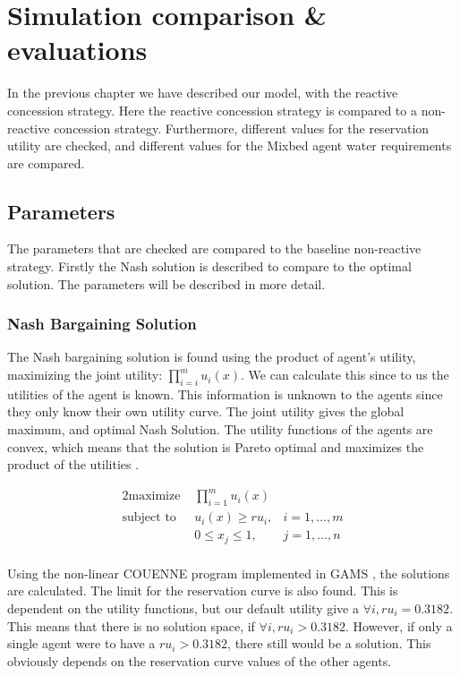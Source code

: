 \chapter{Simulation comparison \& evaluations}
\label{ch:eval}
In the previous chapter we have described our model, with the reactive concession strategy. Here the reactive concession strategy is compared to a non-reactive concession strategy. Furthermore, different values for the reservation utility are checked, and different values for the Mixbed agent water requirements are compared. 

\section{Parameters}
The parameters that are checked are compared to the baseline non-reactive strategy. Firstly the Nash solution is described to compare to the optimal solution. The parameters will be described in more detail.

\subsection{Nash Bargaining Solution}
The Nash bargaining solution is found using the product of agent's utility, maximizing the joint utility: $\prod_{i=i}^{m}u_i(x).$ We can calculate this since to us the utilities of the agent is known. This information is unknown to the agents since they only know their own utility curve. The joint utility gives the global maximum, and optimal Nash Solution. The utility functions of the agents are convex, which means that the solution is Pareto optimal and maximizes the product of the utilities \citep{nash1950bargaining, roth1977individual, lensberg1988stability}. 

\begin{alignat*}{2}
\text{maximize }   	& \prod_{i=1}^m u_i(x)  \\
\text{subject to \ } 	& u_i(x) \geq ru_i, & i = 1,...,m\\
& 0\leq x_j\leq 1, & j = 1,...,n\\
\end{alignat*}

Using the non-linear COUENNE program \citep{belotti2013mixed} implemented in GAMS \citep{GamsSoftware2013}, the solutions are calculated. The limit for the reservation curve is also found. This is dependent on the utility functions, but our default utility give a $\forall i,  ru_i = 0.3182$. This means that there is no solution space, if $\forall i, ru_i > 0.3182$. However, if only a single agent were to have a $ru_i > 0.3182$, there still would be a solution. This obviously depends on the reservation curve values of the other agents.

